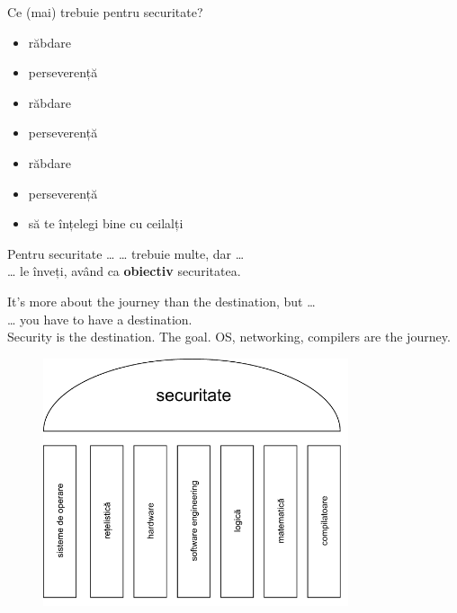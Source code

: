 \documentclass{simple}
\begin{document}
\begin{frame}{Ce (mai) trebuie pentru securitate?}
  \begin{itemize}
    \pause
    \item răbdare
    \pause
    \item perseverență
    \pause
    \item răbdare
    \pause
    \item perseverență
    \pause
    \item răbdare
    \pause
    \item perseverență
    \pause
    \item să te înțelegi bine cu ceilalți
  \end{itemize}
\end{frame}

\begin{frame}{Pentru securitate \ldots}
  \centering
  \pause
  \vspace{0.5cm}
  \Large{\ldots{} trebuie multe, dar \ldots} \\
  \pause
  \vspace{0.5cm}
  \Large{\ldots{} le înveți, având ca \textbf{obiectiv} securitatea.}
\end{frame}

\begin{frame}{}
  \centering
  \pause
  \vspace{0.5cm}
  \Large{It's more about the journey than the destination, but \ldots} \\
  \pause
  \vspace{0.5cm}
  \Large{\ldots{} you have to have a destination.} \\
  \pause
  \vspace{0.5cm}
  \Large{Security is the destination. The goal. OS, networking, compilers are the journey.}
\end{frame}

\begin{frame}{}
  \begin{figure}[!htbp]
    \centering
    \includegraphics[width=0.8\textwidth]{img/security-deps.pdf}
  \end{figure}
\end{frame}
\end{document}
